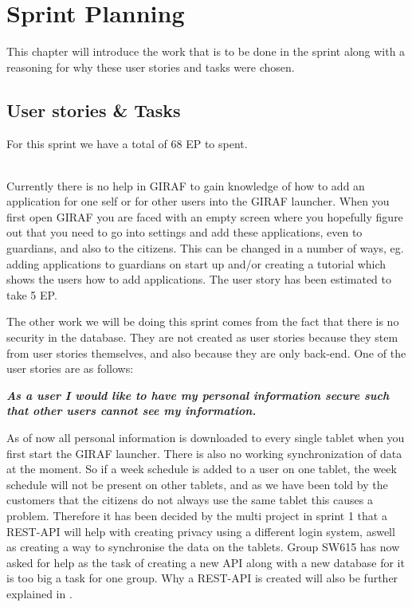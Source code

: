 \chapter{Sprint Planning}
This chapter will introduce the work that is to be done in the sprint along with a reasoning for why these user stories and tasks were chosen.

\section{User stories \& Tasks}
For this sprint we have a total of 68 EP to spent.

\begin{description}[style=unboxed]
    \item[{[}\phigh{]} As a guardian I would like the launcher to tell me how to add applications if none are active, such that it is easier to add applications for beginners.] \hfill \\ 
    Currently there is no help in GIRAF to gain knowledge of how to add an application for one self or for other users into the GIRAF launcher.
    When you first open GIRAF you are faced with an empty screen where you hopefully figure out that you need to go into settings and add these applications, even to guardians, and also to the citizens.
    This can be changed in a number of ways, eg. adding applications to guardians on start up and/or creating a tutorial which shows the users how to add applications.
    The user story has been estimated to take 5 EP.
\end{description}
The other work we will be doing this sprint comes from the fact that there is no security in the database.
They are not created as user stories because they stem from user stories themselves, and also because they are only back-end.
One of the user stories are as follows:

\textbf{\textit{As a user I would like to have my personal information secure such that other users cannot see my information.}}

As of now all personal information is downloaded to every single tablet when you first start the GIRAF launcher.
There is also no working synchronization of data at the moment. 
So if a week schedule is added to a user on one tablet, the week schedule will not be present on other tablets, and as we have been told by the customers that the citizens do not always use the same tablet this causes a problem.
Therefore it has been decided by the multi project in sprint 1 that a REST-API will help with creating privacy using a different login system, aswell as creating a way to synchronise the data on the tablets.
Group SW615 has now asked for help as the task of creating a new API along with a new database for it is too big a task for one group.
Why a REST-API is created will also be further explained in .

